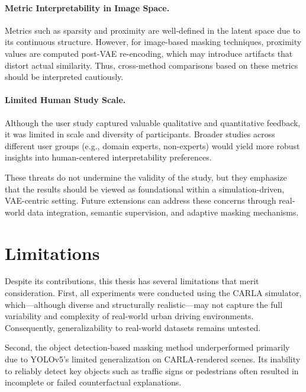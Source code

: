 \vspace{-1em}

\paragraph{Metric Interpretability in Image Space.} Metrics such as sparsity and proximity are well-defined in the latent space due to its continuous structure. However, for image-based masking techniques, proximity values are computed post-VAE re-encoding, which may introduce artifacts that distort actual similarity. Thus, cross-method comparisons based on these metrics should be interpreted cautiously.

\vspace{-1em}

\paragraph{Limited Human Study Scale.} Although the user study captured valuable qualitative and quantitative feedback, it was limited in scale and diversity of participants. Broader studies across different user groups (e.g., domain experts, non-experts) would yield more robust insights into human-centered interpretability preferences.

These threats do not undermine the validity of the study, but they emphasize that the results should be viewed as foundational within a simulation-driven, VAE-centric setting. Future extensions can address these concerns through real-world data integration, semantic supervision, and adaptive masking mechanisms.


\section{Limitations} \label{sec:limitations}
Despite its contributions, this thesis has several limitations that merit consideration. First, all experiments were conducted using the CARLA simulator, which—although diverse and structurally realistic—may not capture the full variability and complexity of real-world urban driving environments. Consequently, generalizability to real-world datasets remains untested.

Second, the object detection-based masking method underperformed primarily due to YOLOv5’s limited generalization on CARLA-rendered scenes. Its inability to reliably detect key objects such as traffic signs or pedestrians often resulted in incomplete or failed counterfactual explanations.

